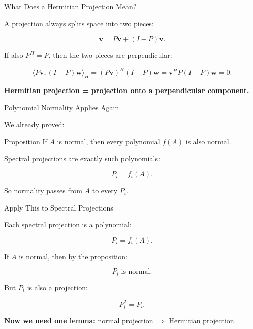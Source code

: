 \documentclass[10pt]{beamer}
\theoremstyle{definition}
\newcommand{\x}[1]{\alert{\textbf{#1}}}
\begin{document}
\begin{frame}{What Does a Hermitian Projection Mean?}

A projection always splits space into two pieces:

$$
\mathbf v=P\mathbf v+(I-P)\mathbf v.
$$

\vfill\pause

If also $P^H=P$, then the two pieces are perpendicular:

$$
\langle P\mathbf v,(I-P)\mathbf w\rangle_H
=(P\mathbf v)^H(I-P)\mathbf w
=\mathbf v^HP(I-P)\mathbf w=0.
$$

\vfill

\x{Hermitian projection = projection onto a perpendicular component.}

\end{frame}


\begin{frame}{Polynomial Normality Applies Again}

We already proved:

\begin{block}{Proposition}
If $A$ is normal, then every polynomial $f(A)$ is also normal.
\end{block}

\vfill\pause

Spectral projections are exactly such polynomials:

$$
P_i=f_i(A).
$$

\vfill

So normality passes from $A$ to every $P_i$.

\end{frame}


\begin{frame}{Apply This to Spectral Projections}

Each spectral projection is a polynomial:

$$
P_i=f_i(A).
$$

\vfill\pause

If $A$ is normal, then by the proposition:

$$
P_i\text{ is normal}.
$$

\vfill\pause

But $P_i$ is also a projection:

$$
P_i^2=P_i.
$$

\vfill

\x{Now we need one lemma:} normal projection $\Rightarrow$ Hermitian projection.

\end{frame}
\end{document}

